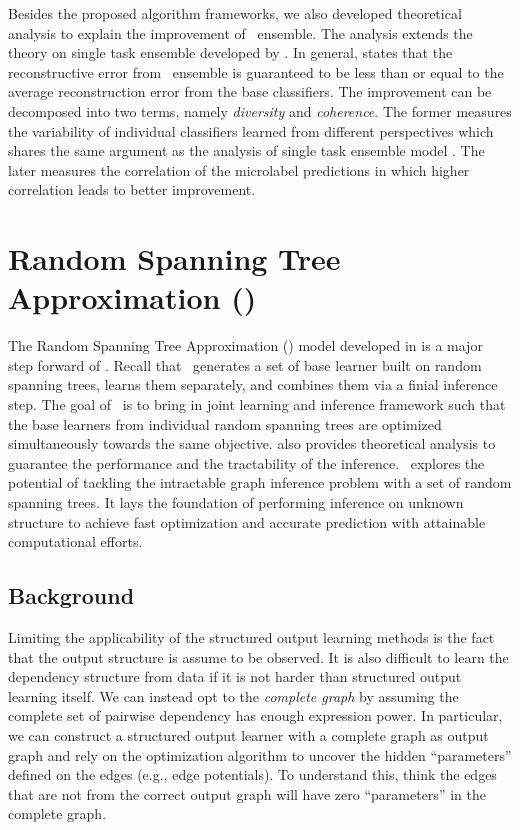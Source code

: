 {Besides the proposed algorithm frameworks, we also developed theoretical analysis to explain the improvement of \mam\ ensemble.
The analysis extends the theory on single task ensemble developed by \citet{Brown10good}.
In general,  states that the reconstructive error from \mam\ ensemble is guaranteed to be less than or equal to the average reconstruction error from the base classifiers.
The improvement can be decomposed into two terms, namely \textit{diversity} and \textit{coherence}.
The former measures the variability of individual classifiers learned from different perspectives which shares the same argument as the analysis of single task ensemble model \citep{Brown10good}.
The later measures the correlation of the microlabel predictions in which higher correlation leads to better improvement.



%
%
\section{Random Spanning Tree Approximation (\rta)}\label{sc_su14c}

The Random Spanning Tree Approximation (\rta) model developed in  is a major step forward of \mam.
Recall that \mam\ generates a set of base learner built on random spanning trees, learns them separately, and combines them via a finial inference step.
The goal of \rta\ is to bring in joint learning and inference framework such that the base learners from individual random spanning trees are optimized simultaneously towards the same objective.
 also provides theoretical analysis to guarantee the performance and the tractability of the inference.
\rta\ explores the potential of tackling the intractable graph inference problem with a set of random spanning trees.
It lays the foundation of performing inference on unknown structure to achieve fast optimization and accurate prediction with attainable computational efforts.



%
%
\subsection{Background}

Limiting the applicability of the structured output learning methods is the fact that the output structure is assume to be observed.
It is also difficult to learn the dependency structure from data \citep{Chickering94learning} if it is not harder than structured output learning itself.
We can instead opt to the \textit{complete graph} by assuming the complete set of pairwise dependency has enough expression power.
In particular, we can construct a structured output learner with a complete graph as output graph and rely on the optimization algorithm to uncover the hidden ``parameters'' defined on the edges (e.g., edge potentials).
To understand this, think the edges that are not from the correct output graph will have zero ``parameters'' in the complete graph.

}

